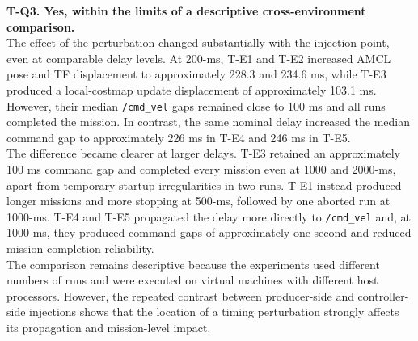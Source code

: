 \noindent \textbf{T-Q3. Yes, within the limits of a descriptive cross-environment comparison.}
\\
The effect of the perturbation changed substantially with the injection point, even at comparable delay levels. At 200-ms, T-E1 and T-E2 increased AMCL pose and TF displacement to approximately 228.3 and 234.6 ms, while T-E3 produced a local-costmap update displacement of approximately 103.1 ms. However, their median \texttt{/cmd\_vel} gaps remained close to 100 ms and all runs completed the mission. In contrast, the same nominal delay increased the median command gap to approximately 226 ms in T-E4 and 246 ms in T-E5.
\\
The difference became clearer at larger delays. T-E3 retained an approximately 100 ms command gap and completed every mission even at 1000 and 2000-ms, apart from temporary startup irregularities in two runs. T-E1 instead produced longer missions and more stopping at 500-ms, followed by one aborted run at 1000-ms. T-E4 and T-E5 propagated the delay more directly to \texttt{/cmd\_vel} and, at 1000-ms, they produced command gaps of approximately one second and reduced mission-completion reliability.
\\
The comparison remains descriptive because the experiments used different numbers of runs and were executed on virtual machines with different host processors. However, the repeated contrast between producer-side and controller-side injections shows that the location of a timing perturbation strongly affects its propagation and mission-level impact.